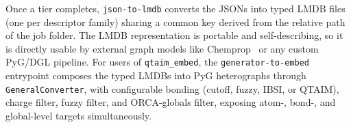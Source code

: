 Once a tier completes, \texttt{json-to-lmdb} converts the JSONs into typed LMDB files (one
per descriptor family) sharing a common key derived from the relative path of the job
folder. The LMDB representation is portable and self-describing, so it is directly usable
by external graph models like Chemprop~\citep{Heid2024-gd} or any custom PyG/DGL pipeline.
For users of \texttt{qtaim\_embed}, the \texttt{generator-to-embed} entrypoint composes the
typed LMDBs into PyG heterographs through \texttt{GeneralConverter}, with configurable
bonding (cutoff, fuzzy, IBSI, or QTAIM), charge filter, fuzzy filter, and ORCA-globals
filter, exposing atom-, bond-, and global-level targets simultaneously.

%
%
%
%
%


